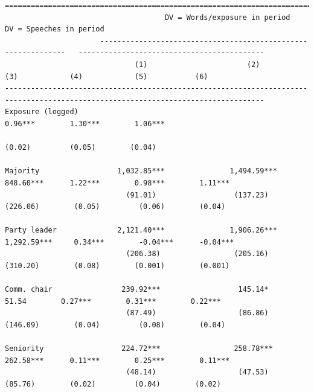 \documentclass[letter,12pt]{article}
\begin{document}
\begin{table} \centering 
  \begin{tiny}
    \begin{verbatim}
==================================================================================================================================
                                     DV = Words/exposure in period                              DV = Speeches in period               
                      --------------------------------------------------------------   -------------------------------------------
                              (1)                       (2)                 (3)            (4)            (5)           (6)     
----------------------------------------------------------------------------------------------------------------------------------
Exposure (logged)                                                                       0.96***        1.30***        1.06***   
                                                                                         (0.02)         (0.05)        (0.04)    
                                                                                                                                
Majority                  1,032.85***               1,494.59***          848.60***      1.22***        0.98***        1.11***   
                            (91.01)                  (137.23)            (226.06)        (0.05)         (0.06)        (0.04)    
                                                                                                                                
Party leader              2,121.40***               1,906.26***         1,292.59***     0.34***        -0.04***      -0.04***   
                            (206.38)                 (205.16)            (310.20)        (0.08)        (0.001)        (0.001)   
                                                                                                                                
Comm. chair                239.92***                  145.14*              51.54        0.27***        0.31***        0.22***   
                            (87.49)                   (86.86)            (146.09)        (0.04)         (0.08)        (0.04)    
                                                                                                                                
Seniority                  224.72***                 258.78***           262.58***      0.11***        0.25***        0.11***   
                            (48.14)                   (47.53)             (85.76)        (0.02)         (0.04)        (0.02)    
                                                                                                                                

\end{verbatim}
\end{tiny}
\end{table}
\end{document}
